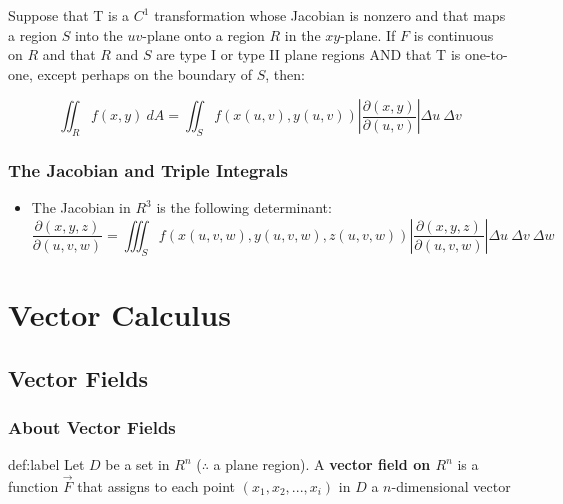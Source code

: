 \documentclass{package/notes}
\begin{document}
\begin{proposition}
	Suppose that T is a $C^1$ transformation whose Jacobian is nonzero and that maps a region $S$ into the $uv$-plane onto a region $R$ in the $xy$-plane. If $F$ is continuous on $R$ and that $R$ and $S$ are type I or type II plane regions AND that T is one-to-one, except perhaps on the boundary of $S$, then:

	$$\iint_R f(x,y)\:dA = \iint_Sf(x(u,v),y(u,v))\left|\frac{\partial(x,y)}{\partial(u,v)}\right|\Delta u\:\Delta v$$
\end{proposition}


\subsection{The Jacobian and Triple Integrals}

\begin{itemize}
	\item The Jacobian in $R^3$ is the following determinant:
	$$\frac{\partial(x,y,z)}{\partial(u,v,w)} = \iiint_Sf(x(u,v,w),y(u,v,w),z(u,v,w))\left|\frac{\partial(x,y,z)}{\partial(u,v,w)}\right|\Delta u\:\Delta v\:\Delta w$$
\end{itemize}





\chapter{Vector Calculus}


\section{Vector Fields}


\subsection{About Vector Fields}

\begin{definition}{def:label}
	Let $D$ be a set in $R^n$ ($\therefore$ a plane region). A \textbf{vector field on $R^n$} is a function $\vec F$ that assigns to each point $(x_1,x_2,...,x_i)$ in $D$ a $n$-dimensional vector
\end{definition}
\end{document}
